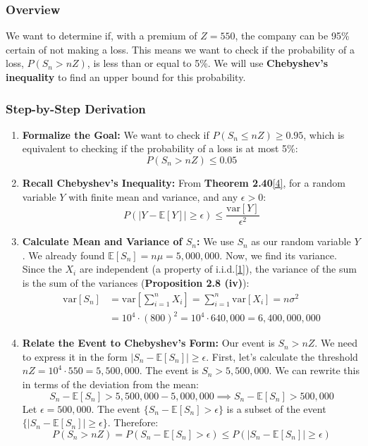 \documentclass[11pt,a4paper]{article}
\begin{document}
\subsubsection{Overview}
We want to determine if, with a premium of $Z=550$, the company can be 95\% certain of not making a loss. This means we want to check if the probability of a loss, $P(S_n > nZ)$, is less than or equal to 5\%. We will use \textbf{Chebyshev's inequality} to find an upper bound for this probability.

\subsubsection{Step-by-Step Derivation}
\begin{enumerate}
    \item \textbf{Formalize the Goal:} We want to check if $P(S_n \le nZ) \ge 0.95$, which is equivalent to checking if the probability of a loss is at most 5\%:
    \[ P(S_n > nZ) \le 0.05 \]

    \item \textbf{Recall Chebyshev's Inequality:} From \textbf{Theorem 2.40}\hyperlink{note4}{[4]}, for a random variable $Y$ with finite mean and variance, and any $\epsilon > 0$:
    \[ P(|Y - \mathbb{E}[Y]| \ge \epsilon) \le \frac{\text{var}[Y]}{\epsilon^2} \]

    \item \textbf{Calculate Mean and Variance of $S_n$:} We use $S_n$ as our random variable $Y$. We already found $\mathbb{E}[S_n] = n\mu = 5,000,000$. Now, we find its variance. Since the $X_i$ are independent (a property of i.i.d.\hyperlink{note1}{[1]}), the variance of the sum is the sum of the variances (\textbf{Proposition 2.8 (iv)}):
    \begin{align*}
        \text{var}[S_n] &= \text{var}\left[\sum_{i=1}^n X_i\right] = \sum_{i=1}^n \text{var}[X_i] = n\sigma^2 \\
        &= 10^4 \cdot (800)^2 = 10^4 \cdot 640,000 = 6,400,000,000
    \end{align*}

    \item \textbf{Relate the Event to Chebyshev's Form:} Our event is $S_n > nZ$. We need to express it in the form $|S_n - \mathbb{E}[S_n]| \ge \epsilon$.
    First, let's calculate the threshold $nZ = 10^4 \cdot 550 = 5,500,000$.
    The event is $S_n > 5,500,000$.
    We can rewrite this in terms of the deviation from the mean:
    \[ S_n - \mathbb{E}[S_n] > 5,500,000 - 5,000,000 \implies S_n - \mathbb{E}[S_n] > 500,000 \]
    Let $\epsilon = 500,000$. The event $\{S_n - \mathbb{E}[S_n] > \epsilon\}$ is a subset of the event $\{|S_n - \mathbb{E}[S_n]| \ge \epsilon\}$. Therefore:
    \[ P(S_n > nZ) = P(S_n - \mathbb{E}[S_n] > \epsilon) \le P(|S_n - \mathbb{E}[S_n]| \ge \epsilon) \]


\end{enumerate}
\end{document}
